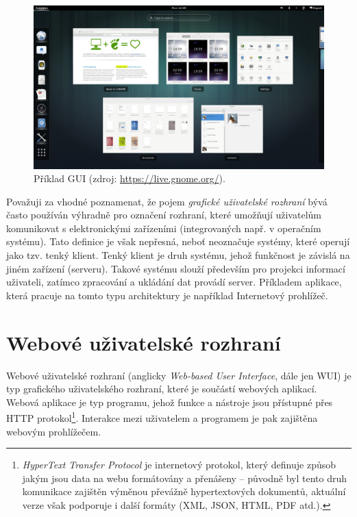 \begin{figure}[htbp]
    \centering
    \includegraphics[width=\textwidth]{images/gui-example.png}
    \caption{Příklad GUI (zdroj: \url{https://live.gnome.org/}).}
\end{figure}

Považuji za vhodné poznamenat, že pojem \textit{grafické uživatelské rozhraní} bývá často používán výhradně pro označení rozhraní, které umožňují uživatelům komunikovat s elektronickými zařízeními (integrovaných např. v operačním systému). Tato definice je však nepřesná, neboť neoznačuje systémy, které operují jako tzv. tenký klient. Tenký klient je druh systému, jehož funkčnost je závislá na jiném zařízení (serveru). Takové systému slouží především pro projekci informací uživateli, zatímco zpracování a ukládání dat provádí server. Příkladem aplikace, která pracuje na tomto typu architektury je například Internetový prohlížeč.

\section{Webové uživatelské rozhraní}
\label{sec:wui}

Webové uživatelské rozhraní (anglicky \textit{Web-based User Interface}, dále jen WUI) je typ grafického uživatelského rozhraní, které je součástí webových aplikací. Webová aplikace je typ programu, jehož funkce a nástroje jsou přístupné přes HTTP protokol\footnote{\textit{HyperText Transfer Protocol} je internetový protokol, který definuje způsob jakým jsou data na webu formátovány a přenášeny -- původně byl tento druh komunikace zajištěn výměnou převážně hypertextových dokumentů, aktuální verze však podporuje i další formáty (XML, JSON, HTML, PDF atd.).}. Interakce mezi uživatelem a programem je pak zajištěna webovým prohlížečem.

